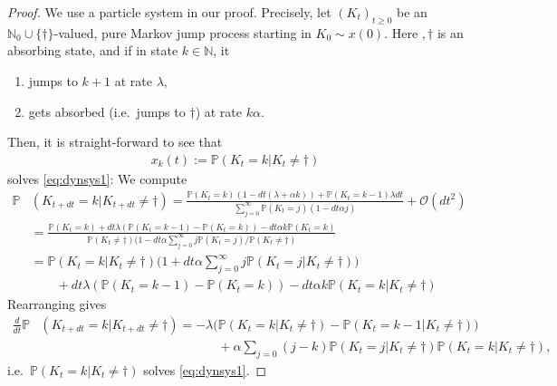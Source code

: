 \documentclass{imsart}
\theoremstyle{plain}
\theoremstyle{definition}
\begin{document}
\begin{proof}
  We use a particle system in our proof. Precisely, let $(K_t)_{t\geq
    0}$ be an $\mathbb N_0 \cup \{\dagger\}$-valued, pure Markov jump process starting in $K_0 \sim x(0)$. Here $, \dagger$ is an absorbing state, and if in state $k \in \mathbb N$, it
  \begin{enumerate}
  \item jumps to $k+1$ at rate $\lambda$,
  \item gets absorbed (i.e.\ jumps to $\dagger$) at rate $k\alpha$.
  \end{enumerate}
  Then, it is straight-forward to see that
  \begin{align}
  \label{eq:sfts}
  x_k(t) := \mathbb P(K_t=k|K_t\neq \dagger)
  \end{align}
  solves \eqref{eq:dynsys1}: We compute
  \begin{align*}
  \mathbb P & (K_{t + dt} = k | K_{t + dt} \neq \dagger) = \frac{\mathbb P(K_{t} = k) (1 - dt (\lambda + \alpha k)) + \mathbb P(K_{t} = k-1) \lambda dt }{ \sum_{j=0}^\infty \mathbb P(K_t = j)(1 - dt \alpha j)} + \mathcal O(dt^2) \\ & = 
  \frac{\mathbb P(K_t = k) + dt \lambda (\mathbb P(K_t = k-1) - \mathbb P(K_t = k)) - dt \alpha k \mathbb P(K_t = k)}{\mathbb P(K_t \neq \dagger) (1 - dt \alpha \sum_{j=0}^\infty j \mathbb P(K_t=j) / \mathbb P(K_t \neq \dagger)} \\ & = 
  \mathbb P(K_{t} = k | K_{t} \neq \dagger)\Big(1 + dt \alpha \sum_{j=0}^\infty j \mathbb P(K_t = j | K_t \neq \dagger)\Big) \\ & \qquad + dt \lambda (\mathbb P(K_t = k-1) - \mathbb P(K_t = k)) - dt \alpha k \mathbb P(K_t = k | K_t \neq \dagger)
  \end{align*}
  Rearranging gives
  \begin{align*}
      \frac{d}{dt} \mathbb P & (K_{t + dt} = k | K_{t + dt} \neq \dagger) = -\lambda\Big(\mathbb P (K_{t} = k | K_{t} \neq \dagger) - \mathbb P (K_{t} = k-1 | K_{t} \neq \dagger)\Big) \\ & \qquad \qquad \qquad \qquad \qquad \qquad \qquad + \alpha \sum_{j = 0} (j - k) \mathbb P(K_t = j | K_t \neq \dagger)\mathbb P(K_t = k | K_t \neq \dagger),
  \end{align*}
  i.e.\ $\mathbb P(K_t = k | K_t \neq \dagger)$ solves \eqref{eq:dynsys1}. 
  

\end{proof}
\end{document}
